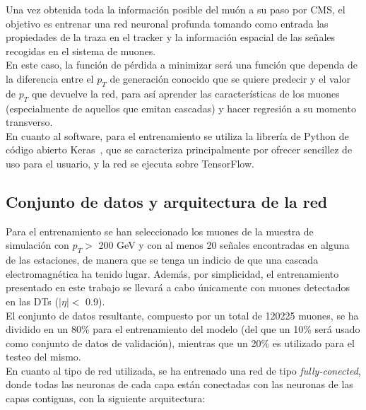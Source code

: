 
Una vez obtenida toda la informaci\'on posible del mu\'on a su paso por CMS, el objetivo es entrenar una red neuronal profunda tomando como entrada las propiedades de la traza en el tracker y la informaci\'on espacial de las se\~nales recogidas en el sistema de muones. \\
En este caso, la funci\'on de p\'erdida a minimizar ser\'a una funci\'on que dependa de la diferencia entre el $p_{T}$ de generaci\'on conocido que se quiere predecir y el valor de $p_{T}$ que devuelve la red, para as\'i aprender las caracter\'isticas de los muones (especialmente de aquellos que emitan cascadas) y hacer regresi\'on a su momento transverso. \\

En cuanto al software, para el entrenamiento se utiliza la librer\'ia de Python de c\'odigo abierto Keras~\cite{chollet2015keras}, que se caracteriza principalmente por ofrecer sencillez de uso para el usuario, y la red se ejecuta sobre TensorFlow. \\


\subsection{Conjunto de datos y arquitectura de la red}\label{sec:arch}

Para el entrenamiento se han seleccionado los muones de la muestra de simulaci\'on con $p_{T} > $ 200 GeV y con al menos 20 se\~nales encontradas en alguna de las estaciones, de manera que se tenga un indicio de que una cascada electromagn\'etica ha tenido lugar. Adem\'as, por simplicidad, el entrenamiento presentado en este trabajo se llevar\'a a cabo \'unicamente con muones detectados en las DTs ($\lvert \eta \rvert <$ 0.9). \\
El conjunto de datos resultante, compuesto por un total de 120225 muones, se ha dividido en un 80\% para el entrenamiento del modelo (del que un 10\% ser\'a usado como conjunto de datos de validaci\'on), mientras que un 20\% es utilizado para el testeo del mismo. \\

En cuanto al tipo de red utilizada, se ha entrenado una red de tipo \textit{fully-conected}, donde todas las neuronas de cada capa est\'an conectadas con las neuronas de las capas contiguas, con la siguiente arquitectura:


